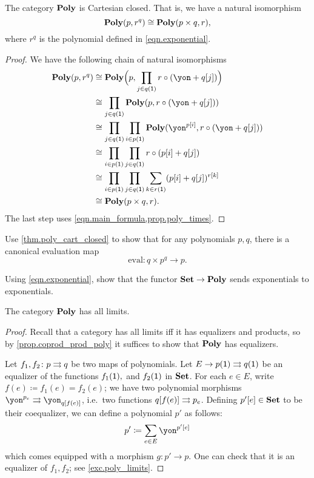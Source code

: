 \documentclass[DynamicalBook]{subfiles}
\begin{document}
\begin{theorem}\label{thm.poly_cart_closed}
The category $\textbf{Poly}$ is Cartesian closed. That is, we have a natural isomorphism
\[
  \textbf{Poly}(p,r^q)\cong\textbf{Poly}(p\times q,r),
\]
where $r^q$ is the polynomial defined in \eqref{eqn.exponential}.
\end{theorem}
\begin{proof}
We have the following chain of natural isomorphisms
\begin{align*}
	\poly(p,r^q)&\cong
	\poly\Big(p,\prod_{j\in q(\1)}r\circ (\yon+q[j])\Big)\\&\cong
	\prod_{j\in q(\1)}\poly(p,r\circ(\yon+q[j]))\\&\cong
	\prod_{j\in q(\1)}\prod_{i\in p(\1)}\poly(\yon^{p[i]},r\circ(\yon+q[j]))\\&\cong
	\prod_{i\in p(\1)}\prod_{j\in q(\1)}r\circ(p[i]+q[j])\\&\cong
	\prod_{i\in p(\1)}\prod_{j\in q(\1)}\sum_{k\in r(\1)}(p[i]+q[j])^{r[k]}\\&\cong
	\poly(p\times q,r).
\end{align*}
The last step uses \cref{eqn.main_formula,prop.poly_times}.
\end{proof}

\begin{exercise}
Use \cref{thm.poly_cart_closed} to show that for any polynomials $p,q$, there is a canonical evaluation map
\begin{equation}\label{eqn.eval_times}
	\text{eval}\colon q\times p^q\to p.
\end{equation}
\end{exercise}


\begin{exercise}
Using \cref{eqn.exponential}, show that the functor $\textbf{Set}\to\textbf{Poly}$ sends exponentials to exponentials.
\end{exercise}

\begin{theorem}\label{thm.poly_limits}
The category $\textbf{Poly}$ has all limits.
\end{theorem}
\begin{proof}
Recall that a category has all limits iff it has equalizers and products, so by \cref{prop.coprod_prod_poly} it suffices to show that $\textbf{Poly}$ has equalizers. 

Let $f_1,f_2\colon p\rightrightarrows q$ be two maps of polynomials. Let $E\to p(\textsf{1})\rightrightarrows q(\textsf{1})$ be an equalizer of the functions $f_1(\textsf{1}),$ and $f_2(\textsf{1})$ in $\textbf{Set}$. For each $e\in E$, write $f(e)\coloneqq f_1(e)=f_2(e)$; we have two polynomial morphisms $\yon^{p_e}\tto\yon_{q[f(e)]}$, i.e.\ two functions $q[f(e)]\rightrightarrows p_e$. Defining $p'[e]\in\textbf{Set}$ to be their coequalizer, we can define a polynomial $p'$ as follows:
\[
  p'\coloneqq\sum_{e\in E}\yon^{p'[e]}
\]
which comes equipped with a morphism $g\colon p'\to p$. One can check that it is an equalizer of $f_1,f_2$; see \cref{exc.poly_limits}.
\end{proof}
\end{document}
